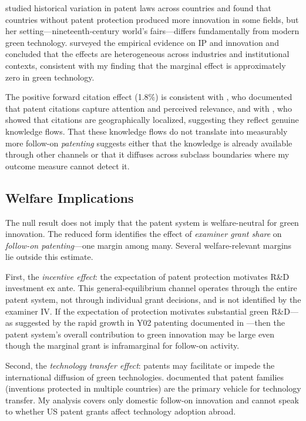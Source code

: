 \documentclass[12pt]{article}
\begin{document}
\citet{moser2005} studied historical variation in patent laws across countries and found that countries without patent protection produced more innovation in some fields, but her setting---nineteenth-century world's fairs---differs fundamentally from modern green technology. \citet{lerner2009} surveyed the empirical evidence on IP and innovation and concluded that the effects are heterogeneous across industries and institutional contexts, consistent with my finding that the marginal effect is approximately zero in green technology.

The positive forward citation effect (1.8\%) is consistent with \citet{hall2005}, who documented that patent citations capture attention and perceived relevance, and with \citet{jaffe1993}, who showed that citations are geographically localized, suggesting they reflect genuine knowledge flows. That these knowledge flows do not translate into measurably more follow-on \emph{patenting} suggests either that the knowledge is already available through other channels or that it diffuses across subclass boundaries where my outcome measure cannot detect it.

\subsection{Welfare Implications}

The null result does not imply that the patent system is welfare-neutral for green innovation. The reduced form identifies the effect of \emph{examiner grant share} on \emph{follow-on patenting}---one margin among many. Several welfare-relevant margins lie outside this estimate.

First, the \emph{incentive effect}: the expectation of patent protection motivates R\&D investment ex ante. This general-equilibrium channel operates through the entire patent system, not through individual grant decisions, and is not identified by the examiner IV. If the expectation of protection motivates substantial green R\&D---as suggested by the rapid growth in Y02 patenting documented in ---then the patent system's overall contribution to green innovation may be large even though the marginal grant is inframarginal for follow-on activity.

Second, the \emph{technology transfer effect}: patents may facilitate or impede the international diffusion of green technologies. \citet{dechezlepretre2011} documented that patent families (inventions protected in multiple countries) are the primary vehicle for technology transfer. My analysis covers only domestic follow-on innovation and cannot speak to whether US patent grants affect technology adoption abroad.
\end{document}
